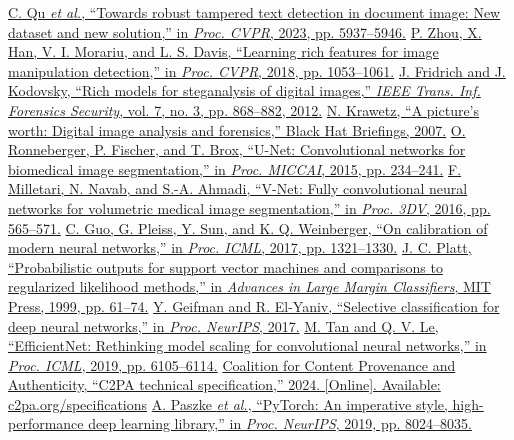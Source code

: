  \href{https://openaccess.thecvf.com/content/CVPR2023/html/Qu_Towards_Robust_Tampered_Text_Detection_in_Document_Image_New_Dataset_CVPR_2023_paper.html}{C. Qu \emph{et al.}, ``Towards robust tampered text detection in document image: New dataset and new solution,'' in \emph{Proc. CVPR}, 2023, pp. 5937--5946.}
 \href{https://arxiv.org/abs/1805.04953}{P. Zhou, X. Han, V. I. Morariu, and L. S. Davis, ``Learning rich features for image manipulation detection,'' in \emph{Proc. CVPR}, 2018, pp. 1053--1061.}
 \href{https://doi.org/10.1109/TIFS.2012.2190402}{J. Fridrich and J. Kodovsky, ``Rich models for steganalysis of digital images,'' \emph{IEEE Trans. Inf. Forensics Security}, vol. 7, no. 3, pp. 868--882, 2012.}
 \href{https://www.blackhat.com/presentations/bh-dc-08/Krawetz/Whitepaper/bh-dc-08-krawetz-WP.pdf}{N. Krawetz, ``A picture's worth: Digital image analysis and forensics,'' Black Hat Briefings, 2007.}
 \href{https://arxiv.org/abs/1505.04597}{O. Ronneberger, P. Fischer, and T. Brox, ``U-Net: Convolutional networks for biomedical image segmentation,'' in \emph{Proc. MICCAI}, 2015, pp. 234--241.}
 \href{https://arxiv.org/abs/1606.04797}{F. Milletari, N. Navab, and S.-A. Ahmadi, ``V-Net: Fully convolutional neural networks for volumetric medical image segmentation,'' in \emph{Proc. 3DV}, 2016, pp. 565--571.}
 \href{https://arxiv.org/abs/1706.04599}{C. Guo, G. Pleiss, Y. Sun, and K. Q. Weinberger, ``On calibration of modern neural networks,'' in \emph{Proc. ICML}, 2017, pp. 1321--1330.}
 \href{https://doi.org/10.7551/mitpress/1113.001.0001}{J. C. Platt, ``Probabilistic outputs for support vector machines and comparisons to regularized likelihood methods,'' in \emph{Advances in Large Margin Classifiers}, MIT Press, 1999, pp. 61--74.}
 \href{https://arxiv.org/abs/1705.08500}{Y. Geifman and R. El-Yaniv, ``Selective classification for deep neural networks,'' in \emph{Proc. NeurIPS}, 2017.}
 \href{https://arxiv.org/abs/1905.11946}{M. Tan and Q. V. Le, ``EfficientNet: Rethinking model scaling for convolutional neural networks,'' in \emph{Proc. ICML}, 2019, pp. 6105--6114.}
 \href{https://c2pa.org/specifications/}{Coalition for Content Provenance and Authenticity, ``C2PA technical specification,'' 2024. [Online]. Available: c2pa.org/specifications}
 \href{https://arxiv.org/abs/1912.01703}{A. Paszke \emph{et al.}, ``PyTorch: An imperative style, high-performance deep learning library,'' in \emph{Proc. NeurIPS}, 2019, pp. 8024--8035.}
